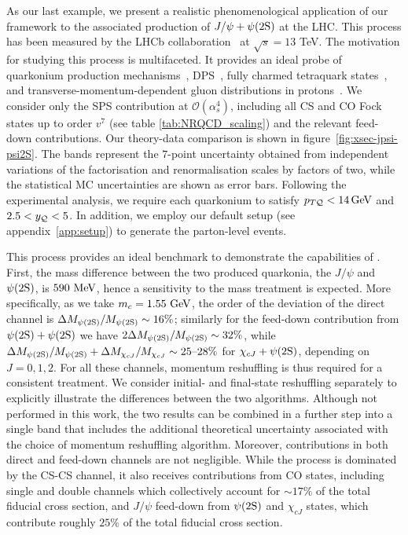 As our last example, we present a realistic phenomenological application of our framework to the associated production of $J/\psi+\psi(2\mathrm{S})$ at the LHC.
This process has been measured by the LHCb collaboration~\cite{LHCb:2023wsl} at $\sqrt{s}=13$ TeV. The motivation for studying this process is multifaceted. It provides an ideal probe of quarkonium production mechanisms~\cite{Qiao:2002rh,Qiao:2009kg,Lansberg:2013qka,Sun:2014gca,Baranov:2015cle,Lansberg:2015lva,He:2019qqr,Lansberg:2019fgm,Lansberg:2020rft,Sun:2023exa,He:2024ugx,He:2025kkw}, DPS~\cite{Kom:2011bd,Lansberg:2014swa,Borschensky:2016nkv,Prokhorov:2020owf}, fully charmed tetraquark states~\cite{ATLAS:2023bft,CMS:2025vnq}, and transverse-momentum-dependent gluon distributions in protons~\cite{Lansberg:2017dzg,Scarpa:2019fol}. We consider only the SPS contribution at $\mathcal{O}(\alpha_s^4)$, including all CS and CO Fock states up to order $v^7$ (see table \ref{tab:NRQCD_scaling}) and the relevant feed-down contributions. 
Our theory-data comparison is shown in figure~\ref{fig:xsec-jpsi-psi2S}. The bands represent the $7$-point uncertainty obtained from independent variations of the factorisation and renormalisation scales by factors of two, while the statistical MC uncertainties are shown as error bars. 
Following the experimental analysis, we require each quarkonium to satisfy $p_{T{\cal Q}} < 14\,{\rm GeV}$ and $2.5 < y_{\cal Q} < 5$. In addition, we employ our default setup (see appendix~\ref{app:setup}) to generate the parton-level events.

This process provides an ideal benchmark to demonstrate the capabilities of \madsons. 
First, the mass difference between the two produced quarkonia, the $J/\psi$ and $\psi(2\mathrm{S})$, is $590~{\rm MeV}$, hence a sensitivity to the mass treatment is expected. More specifically, as we take $m_c = 1.55~{\rm GeV}$, the order of the deviation of the direct channel is ${\Delta M_{\psi(2\mathrm{S})}/M_{\psi(2\mathrm{S})} \sim 16\%}$; similarly for the feed-down contribution from $\psi(2\mathrm{S}) + \psi(2\mathrm{S})$ we have $2 \Delta M_{\psi(2\mathrm{S})}/M_{\psi(2\mathrm{S})} \sim 32\%$, while $\Delta M_{\psi(2\mathrm{S})}/M_{\psi(2\mathrm{S})} + \Delta M_{\chi_{cJ}}/M_{\chi_{cJ}} \sim 25\textrm{--}28\%$ for $\chi_{cJ} + \psi(2\mathrm{S})$, depending on $J=0,1,2$.
For all these channels, momentum reshuffling is thus required for a consistent treatment.
We consider initial- and final-state reshuffling separately to explicitly illustrate the differences between the two algorithms. Although not performed in this work, the two results can be combined in a further step into a single band that includes the additional theoretical uncertainty associated with the choice of momentum reshuffling algorithm.
Moreover, {\pwavetxt} contributions in both direct and feed-down channels are not negligible.
While the process is dominated by the CS-CS channel, it also receives contributions from CO states, including single and double {\pwavetxt} channels which collectively account for $\sim17\%$ of the total fiducial cross section, and $J/\psi$ feed-down from $\psi(2\mathrm{S})$ and $\chi_{cJ}$ states, which contribute roughly $25\%$ of the total fiducial cross section. 


